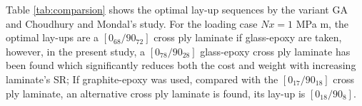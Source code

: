 
Table \ref{tab:comparsion} shows the optimal lay-up sequences by the variant GA
and  Choudhury and Mondal's\cite{choudhury2019failure} study. For the loading
case $Nx=1$ MPa m, the optimal lay-ups are a $[0_{68}/90_{72}]$  cross ply
laminate if glass-epoxy are taken, however,  in the present study, a
$[0_{78}/90_{28}]$ glass-epoxy cross ply laminate has been found which
significantly reduces both the cost and weight with increasing laminate's SR;
If graphite-epoxy was used, compared with the $[0_{17}/90_{18}]$ cross ply
laminate, an alternative cross ply laminate is found, its lay-up is $[0_{18}/90_8]$.
